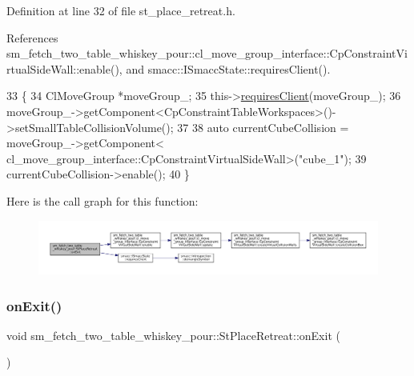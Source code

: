 Definition at line 32 of file st\+\_\+place\+\_\+retreat.\+h.



References sm\+\_\+fetch\+\_\+two\+\_\+table\+\_\+whiskey\+\_\+pour\+::cl\+\_\+move\+\_\+group\+\_\+interface\+::\+Cp\+Constraint\+Virtual\+Side\+Wall\+::enable(), and smacc\+::\+I\+Smacc\+State\+::requires\+Client().


\begin{DoxyCode}
33         \{
34             ClMoveGroup *moveGroup\_;
35             this->\hyperlink{classsmacc_1_1ISmaccState_a7f95c9f0a6ea2d6f18d1aec0519de4ac}{requiresClient}(moveGroup\_);
36             moveGroup\_->getComponent<CpConstraintTableWorkspaces>()->setSmallTableCollisionVolume();
37 
38             \textcolor{keyword}{auto} currentCubeCollision = moveGroup\_->getComponent<
      cl\_move\_group\_interface::CpConstraintVirtualSideWall>(\textcolor{stringliteral}{"cube\_1"});
39             currentCubeCollision->enable();
40         \}
\end{DoxyCode}
Here is the call graph for this function\+:
\nopagebreak
\begin{figure}[H]
\begin{center}
\leavevmode
\includegraphics[width=350pt]{structsm__fetch__two__table__whiskey__pour_1_1StPlaceRetreat_a89197ffd2fe8d2fe2ca09502b0c13bbc_cgraph}
\end{center}
\end{figure}
\mbox{\label{structsm__fetch__two__table__whiskey__pour_1_1StPlaceRetreat_a9e172773e61deb7aa4749df7ef114d3f}} 
\subsubsection{\texorpdfstring{on\+Exit()}{onExit()}\hspace{0.1cm}{\footnotesize\ttfamily [2/2]}}
{\footnotesize\ttfamily void sm\+\_\+fetch\+\_\+two\+\_\+table\+\_\+whiskey\+\_\+pour\+::\+St\+Place\+Retreat\+::on\+Exit (\begin{DoxyParamCaption}\item[{\hyperlink{structsmacc_1_1default__transition__tags_1_1ABORT}{A\+B\+O\+RT}}]{ }\end{DoxyParamCaption})\hspace{0.3cm}{\ttfamily [inline]}}



